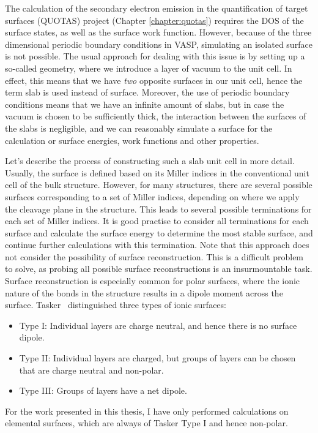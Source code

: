 \begin{refsection}
 
The calculation of the secondary electron emission in the quantification of target surfaces (QUOTAS) project 
(Chapter \ref{chapter:quotas}) requires the \gls{DOS} of the surface states, as well 
as the surface work function. However, because of the three dimensional 
periodic boundary conditions in \gls{VASP}, simulating an isolated surface 
is not possible. The usual approach for dealing with this issue is by setting 
up a so-called  geometry, where we introduce a layer of vacuum to 
the unit cell. In effect, this means that we have \textit{two} opposite 
surfaces in our unit cell, hence the term slab is used instead of surface. 
Moreover, the use of periodic boundary conditions means that we have an 
infinite amount of slabs, but in case the vacuum is chosen to be sufficiently 
thick, the interaction between the surfaces of the slabs is negligible, and we 
can reasonably simulate a surface for the calculation or surface energies, 
work functions and other properties.  

Let's describe the process of constructing such a slab unit cell in more 
detail. Usually, the surface is defined based on its Miller indices in the 
conventional unit cell of the bulk structure. However, for many structures, 
there are several possible surfaces corresponding to a set of Miller indices, 
depending on where we apply the cleavage plane in the structure. This leads to 
several possible terminations for each set of Miller indices. It is good 
practise to consider all terminations for each surface and calculate the 
surface energy to determine the most stable surface, and continue further 
calculations with this termination. Note that this approach does not consider 
the possibility of surface reconstruction. This is a difficult problem to 
solve, as probing all possible surface reconstructions is an insurmountable 
task. Surface reconstruction is especially common for polar surfaces, where 
the ionic nature of the bonds in the structure results in a dipole 
moment across the surface. Tasker~\cite{Tasker1979} distinguished three types 
of ionic surfaces: 
\begin{itemize} 
\item Type I: Individual layers are charge neutral, and hence there is no 
surface dipole. 
\item Type II: Individual layers are charged, but groups of layers can be 
chosen that are charge neutral and non-polar. 
\item Type III: Groups of layers have a net dipole. 
\end{itemize} 
For the work presented in this thesis, I have only performed calculations on 
elemental surfaces, which are always of Tasker Type I and hence non-polar. 
 

\end{refsection}
